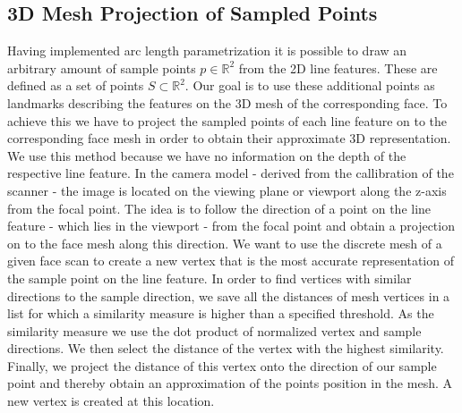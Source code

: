 \subsection{3D Mesh Projection of Sampled Points}
Having implemented arc length parametrization it is possible to draw an arbitrary amount of sample points $p \in \mathbb{R}^2$ from the 2D line features. These are defined as a set of points $S \subset \mathbb{R}^2$. Our goal is to use these additional points as landmarks describing the features on the 3D mesh of the corresponding face. To achieve this we have to project the sampled points of each line feature on to the corresponding face mesh in order to obtain
their approximate 3D representation. We use this method because we have no information on the depth of the respective line feature.  
In the camera model - derived from the callibration of the scanner - the image is located on the viewing plane or viewport along the z-axis from the focal point. The idea is to follow the direction of a point on the line feature - which lies in the viewport - from the focal point and obtain a projection on to the face mesh along this direction. We want to use the discrete mesh of a given face scan to create a new vertex that is the most accurate representation of the sample point on
the line feature. In order to find vertices with similar directions to the sample direction, we save all the distances of mesh vertices in a list for which a similarity measure is higher than a specified threshold. As the similarity measure we use the dot product of normalized vertex and sample directions. We then select the distance of the vertex with the highest similarity. Finally, we project the distance of this vertex onto the direction of our sample point and thereby obtain an approximation of the points position in the mesh. A new vertex is created at this location. %

